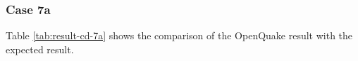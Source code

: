 \subsubsection{Case 7a}




Table \ref{tab:result-cd-7a} shows the comparison of the OpenQuake result with the expected result.